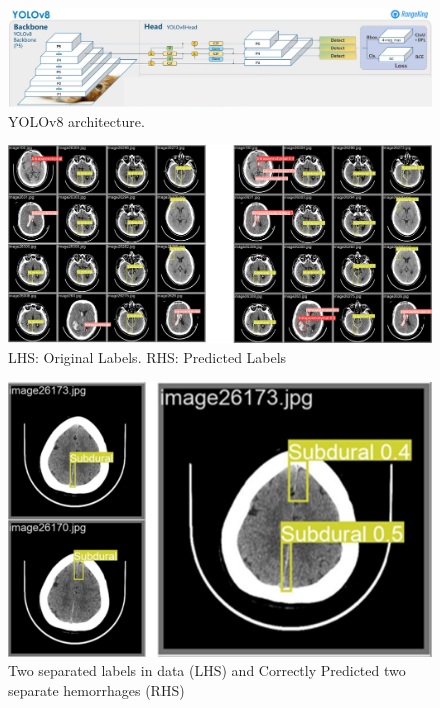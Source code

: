 \documentclass[Print]{../Style/isecure-v24}
\begin{document}
{\begin{figure}[h]
    \centering
    \includegraphics[width=1.0\linewidth]{ISeCure Draft/Images/yolov8.png}
    \captionsetup{font=small}
    \caption{YOLOv8 architecture.}
    \label{fig:yolov8}
\end{figure}}

\newpage
{\begin{figure}[h]
    \centering
    \includegraphics[width=1.0\linewidth]{ISeCure Draft/Images/OrvPrd.png}
    \captionsetup{font=small}
    \caption{LHS: Original Labels. RHS: Predicted Labels}
    \label{fig:OvP}
\end{figure}}

{\begin{figure}[h]
    \centering
    \includegraphics[width=1.0\linewidth]{ISeCure Draft/Images/two_sep.png}
    \captionsetup{font=small}
    \caption{Two separated labels in data (LHS) and Correctly Predicted two separate hemorrhages (RHS)}
    \label{fig:two_sep}
\end{figure}}
\end{document}
